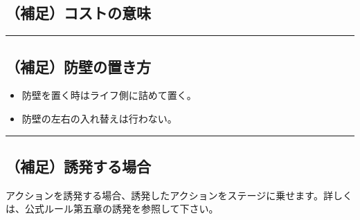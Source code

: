 \documentclass[twocolumn,a5paper,papersize,10pt]{jarticle}
\begin{document}
\subsection*{（補足）コストの意味}
\vspace{-1zh}%
\begin{small}
\end{small}

\vspace{-3zh}%
\hrule height 0.1mm depth 0mm width 66.5mm %
\vspace{-3zh}%

\subsection*{（補足）防壁の置き方}
\vspace{-1zh}%
\begin{itemize}
\setlength{\leftskip}{-0.3cm}%
\setlength{\parskip}{0pt}      %

\item 防壁を置く時はライフ側に詰めて置く。
\item 防壁の左右の入れ替えは行わない。
\end{itemize}

\vspace{-1zh}%
\hrule height 0.1mm depth 0mm width 66.5mm %
\vspace{-3zh}%

\subsection*{（補足）誘発する場合}
\vspace{-1zh}%
アクションを誘発する場合、誘発したアクションをステージに乗せます。詳しくは、公式ルール第五章の誘発を参照して下さい。
\vspace{-1zh}%
\end{document}
